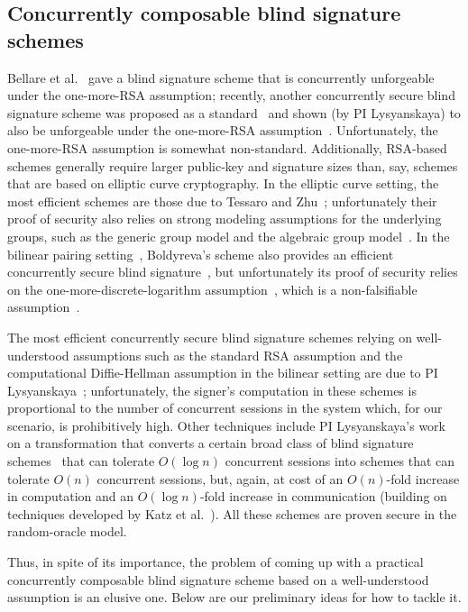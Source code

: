 \subsection{Concurrently composable blind signature schemes}  
\label{rg1:blindsigs}

Bellare et al.~\cite{JC:BNPS03} gave a blind signature scheme that is concurrently unforgeable under the one-more-RSA assumption; recently, another concurrently secure blind signature scheme was proposed as a standard~\cite{} and shown (by PI Lysyanskaya) to also be unforgeable under the one-more-RSA assumption~\cite{EPRINT:Lysyanskaya22}.  Unfortunately, the one-more-RSA assumption is somewhat non-standard.  Additionally, RSA-based schemes generally require larger public-key and signature sizes than, say, schemes that are based on elliptic curve cryptography.  In the elliptic curve setting, the most efficient schemes are those due to Tessaro and Zhu~\cite{EC:TesZhu22}; unfortunately their proof of security also relies on strong modeling assumptions for the underlying groups, such as the generic group model and the algebraic group model~\cite{C:FucKilLos18,EC:Shoup97}.  In the bilinear pairing setting~\cite{}, Boldyreva's scheme also provides an efficient concurrently secure blind signature~\cite{PKC:Boldyreva03}, but unfortunately its proof of security relies on the one-more-discrete-logarithm assumption~\cite{C:BelPal02}, which is a non-falsifiable assumption~\cite{C:Naor03}.  

The most efficient concurrently secure blind signature schemes relying on well-understood assumptions such as the standard RSA assumption and the computational Diffie-Hellman assumption in the bilinear setting are due to PI Lysyanskaya~\cite{}; unfortunately, the signer's computation in these schemes is proportional to the number of concurrent sessions in the system which, for our scenario, is prohibitively high. 
Other techniques include PI Lysyanskaya's work~\cite{} on a transformation that converts a certain broad class of blind signature schemes~\cite{EC:HauKilLos19} that can tolerate $O(\log n)$ concurrent sessions into schemes that can tolerate $O(n)$ concurrent sessions, but, again, at cost of an $O(n)$-fold increase in computation and an $O(\log n)$-fold increase in communication (building on techniques developed by Katz et al.~\cite{AC:KatLosRos21}).  All these schemes are proven secure in the random-oracle model.

Thus, in spite of its importance, the problem of coming up with a practical concurrently composable blind signature scheme based on a well-understood assumption is an elusive one.  Below are our preliminary ideas for how to tackle it.

